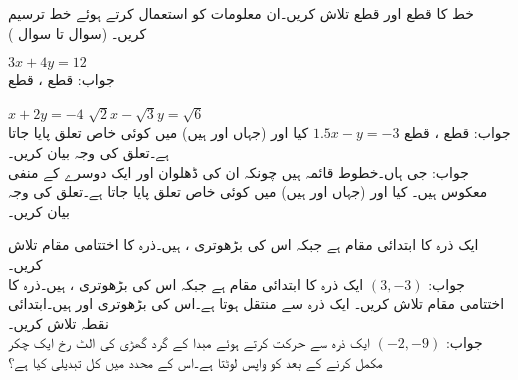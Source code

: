 خط کا  قطع اور  قطع تلاش کریں۔ان معلومات کو استعمال کرتے ہوئے خط ترسیم کریں۔ (سوال  تا سوال )

$3x+4y=12$\\
جواب:\quad
قطع ،
\quad 
قطع  

$x+2y=-4$
$\sqrt{2}x-\sqrt{3}y=\sqrt{6}$\\
جواب:\quad
قطع ،
\quad
قطع 
$1.5x-y=-3$
کیا  اور  (جہاں  اور  ہیں) میں کوئی خاص تعلق پایا جاتا ہے۔تعلق کی وجہ بیان کریں۔\\
جواب:\quad
جی ہاں۔خطوط قائمہ ہیں چونکہ ان کی ڈھلوان  اور  ایک دوسرے کے منفی معکوس ہیں۔
کیا  اور  (جہاں  اور  ہیں) میں کوئی خاص تعلق پایا جاتا ہے۔تعلق کی وجہ بیان کریں۔

ایک ذرہ کا ابتدائی مقام  ہے جبکہ اس کی بڑھوتری ،  ہیں۔ذرہ کا اختتامی مقام تلاش کریں۔\\
جواب:\quad
$(3,-3)$
ایک ذرہ کا ابتدائی مقام  ہے جبکہ اس کی بڑھوتری ،  ہیں۔ذرہ کا اختتامی مقام تلاش کریں۔
ایک ذرہ  سے  منتقل ہوتا ہے۔اس کی بڑھوتری  اور  ہیں۔ابتدائی نقطہ تلاش کریں۔\\
جواب:\quad
$(-2,-9)$
ایک ذرہ  سے حرکت کرتے ہوئے مبدا کے گرد گھڑی کی الٹ رخ ایک چکر مکمل کرنے کے بعد  کو واپس لوٹتا ہے۔اس کے محدد میں کل تبدیلی کیا ہے؟
\\

